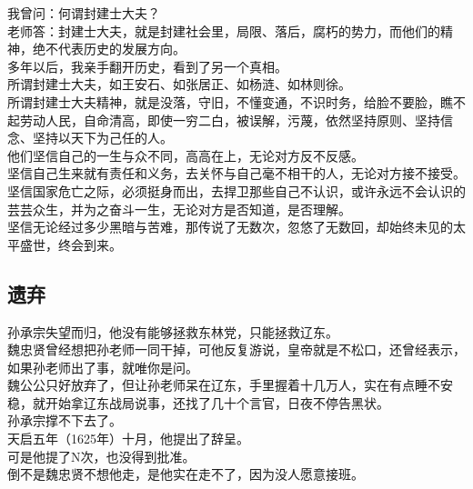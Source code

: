 \begin{multicols}{\theparacolNo}
我曾问：何谓封建士大夫？\\

老师答：封建士大夫，就是封建社会里，局限、落后，腐朽的势力，而他们的精神，绝不代表历史的发展方向。\\

多年以后，我亲手翻开历史，看到了另一个真相。\\

所谓封建士大夫，如王安石、如张居正、如杨涟、如林则徐。\\

所谓封建士大夫精神，就是没落，守旧，不懂变通，不识时务，给脸不要脸，瞧不起劳动人民，自命清高，即使一穷二白，被误解，污蔑，依然坚持原则、坚持信念、坚持以天下为己任的人。\\

他们坚信自己的一生与众不同，高高在上，无论对方反不反感。\\

坚信自己生来就有责任和义务，去关怀与自己毫不相干的人，无论对方接不接受。\\

坚信国家危亡之际，必须挺身而出，去捍卫那些自己不认识，或许永远不会认识的芸芸众生，并为之奋斗一生，无论对方是否知道，是否理解。\\

坚信无论经过多少黑暗与苦难，那传说了无数次，忽悠了无数回，却始终未见的太平盛世，终会到来。\\

\subsection{遗弃}
孙承宗失望而归，他没有能够拯救东林党，只能拯救辽东。\\

魏忠贤曾经想把孙老师一同干掉，可他反复游说，皇帝就是不松口，还曾经表示，如果孙老师出了事，就唯你是问。\\

魏公公只好放弃了，但让孙老师呆在辽东，手里握着十几万人，实在有点睡不安稳，就开始拿辽东战局说事，还找了几十个言官，日夜不停告黑状。\\

孙承宗撑不下去了。\\

天启五年（1625年）十月，他提出了辞呈。\\

可是他提了N次，也没得到批准。\\

倒不是魏忠贤不想他走，是他实在走不了，因为没人愿意接班。\\


\end{multicols}
